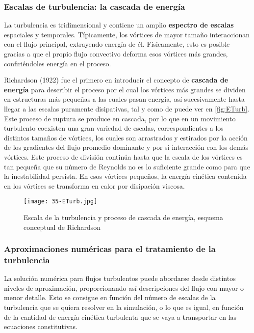 \subsubsection{Escalas de turbulencia: la cascada de
energía}\label{header-n461}

La turbulencia es tridimensional y contiene un amplio \textbf{espectro
de escalas} espaciales y temporales. Típicamente, los vórtices de mayor
tamaño interaccionan con el flujo principal, extrayendo energía de él.
Físicamente, esto es posible gracias a que el propio flujo convectivo
deforma esos vórtices más grandes, confiriéndoles energía en el proceso.

Richardson (1922) fue el primero en introducir el concepto de
\textbf{cascada de energía} para describir el proceso por el cual los
vórtices más grandes se dividen en estructuras más pequeñas a las cuales
pasan energía, así sucesivamente hasta llegar a las escalas puramente
disipativas, tal y como de puede ver en \autoref{fig:ETurb}. Este proceso de ruptura se produce en cascada, por lo que
en un movimiento turbulento coexisten una gran variedad de escalas,
correspondientes a los distintos tamaños de vórtices, los cuales son
arrastrados y estirados por la acción de los gradientes del flujo
promedio dominante y por si interacción con los demás vórtices. Este
proceso de división continúa hasta que la escala de los vórtices es tan
pequeña que su número de Reynolds no es lo suficiente grande como para
que la inestabilidad persista. En esos vórtices pequeños, la energía
cinética contenida en los vórtices se transforma en calor por disipación
viscosa.

\begin{figure}
\centering
\texttt{[image: 35-ETurb.jpg]}
\caption[Escala de la turbulencia]{Escala de la turbulencia y proceso de cascada de energía, esquema conceptual de Richardson}
\label{fig:ETurb}
\end{figure}

\subsubsection{Aproximaciones numéricas para el tratamiento de la
turbulencia}\label{header-n472}

La solución numérica para flujos turbulentos puede abordarse desde
distintos niveles de aproximación, proporcionando así descripciones del
flujo con mayor o menor detalle. Esto se consigue en función del número
de escalas de la turbulencia que se quiera resolver en la simulación, o
lo que es igual, en función de la cantidad de energía cinética
turbulenta que se vaya a transportar en las ecuaciones constitutivas.

